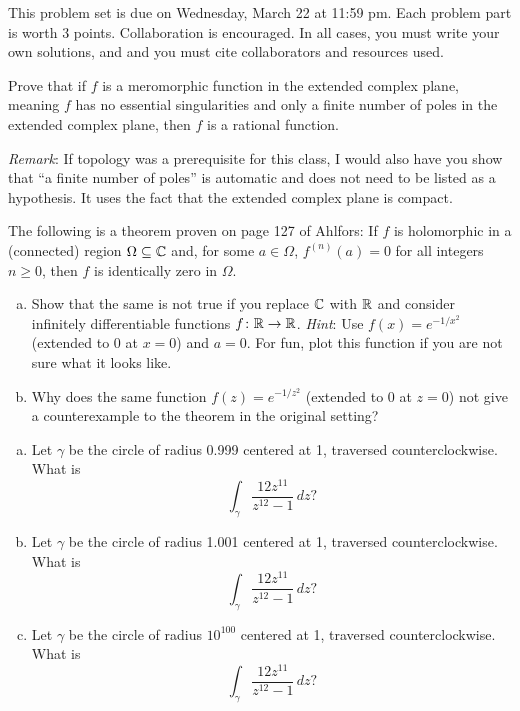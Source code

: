 \maketitle

This problem set is due on Wednesday, March 22 at 11:59 pm. Each problem part is worth 3 points. Collaboration is encouraged. In all cases, you must write your own solutions, and and you must cite collaborators and resources used.

\begin{problem}
  Prove that if $f$ is a meromorphic function in the extended complex plane, meaning $f$ has no essential singularities and only a finite number of poles in the extended complex plane, then $f$ is a rational function.

  \emph{Remark}: If topology was a prerequisite for this class, I would also have you show that ``a finite number of poles'' is automatic and does not need to be listed as a hypothesis. It uses the fact that the extended complex plane is compact.
\end{problem}

\begin{problem}
  The following is a theorem proven on page 127 of Ahlfors: If $f$ is holomorphic in a (connected) region $\Omega\subseteq\mathbb{C}$ and, for some $a\in\Omega$, $f^{(n)}(a)=0$ for all integers $n\geq 0$, then $f$ is identically zero in $\Omega$.
  \begin{enumerate}[(a)]
    \item Show that the same is not true if you replace $\mathbb{C}$ with $\mathbb{R}$ and consider infinitely differentiable functions $f\colon\mathbb{R}\to\mathbb{R}$. \emph{Hint}: Use $f(x)=e^{-1/x^2}$ (extended to 0 at $x=0$) and $a=0$. For fun, plot this function if you are not sure what it looks like.
    \item Why does the same function $f(z)=e^{-1/z^2}$ (extended to 0 at $z=0$) not give a counterexample to the theorem in the original setting?
  \end{enumerate}
\end{problem}

\begin{problem}
  \leavevmode\begin{enumerate}[(a)]
    \item Let $\gamma$ be the circle of radius 0.999 centered at 1, traversed counterclockwise. What is
    \[\int_\gamma \frac{12z^{11}}{z^{12}-1}\,dz?\]
    \item Let $\gamma$ be the circle of radius 1.001 centered at 1, traversed counterclockwise. What is
    \[\int_\gamma \frac{12z^{11}}{z^{12}-1}\,dz?\]
    \item Let $\gamma$ be the circle of radius $10^{100}$ centered at 1, traversed counterclockwise. What is
    \[\int_\gamma \frac{12z^{11}}{z^{12}-1}\,dz?\]
  \end{enumerate}  
\end{problem}

